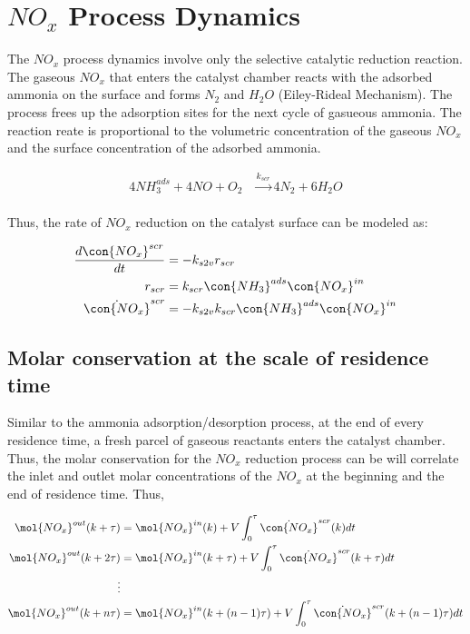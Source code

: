 \newpage
\section{$NO_x$ Process Dynamics}

The $NO_x$ process dynamics involve only the selective catalytic reduction
reaction. The gaseous $NO_x$ that enters the catalyst chamber reacts with the
adsorbed ammonia on the surface and forms $N_2$ and $H_2O$ (Eiley-Rideal
Mechanism). The process frees up the adsorption sites for the next cycle of
gasueous ammonia. The reaction reate is proportional to the volumetric concentration of the gaseous $NO_x$ and the surface concentration of the adsorbed ammonia.

\begin{align}
    4 NH_3 ^{ads} + 4 NO + O_2 &\xrightarrow[]{k_{scr}} 4 N_2 + 6 H_2O
\end{align}


Thus, the rate of $NO_x$ reduction on the catalyst surface can be modeled as:

\begin{align}
    \frac{d \con{NO_x}^{scr}}{dt} &= - k_{s2v} r_{scr} \\
    r_{scr} &= k_{scr} \con{NH_3}^{ads} \con{NO_x}^{in}\\
    \dot{\con{NO_x}}^{scr} &= -k_{s2v} k_{scr} \con{NH_3}^{ads} \con{NO_x}^{in}
\end{align}


\subsection{Molar conservation at the scale of residence time}

Similar to the ammonia adsorption/desorption process, at the end of every
residence time, a fresh parcel of gaseous reactants enters the catalyst
chamber. Thus, the molar conservation for the $NO_x$ reduction process can be
will correlate the inlet and outlet molar concentrations of the $NO_x$ at the
beginning and the end of residence time. Thus,

\begin{align*}
    \mol{NO_x}^{out} (k + \tau) &= \mol{NO_x}^{in} (k) + V \int_{0}^{\tau}  \dot{\con{NO_x}}^{scr} (k) dt\\
    \mol{NO_x}^{out} (k + 2\tau) &= \mol{NO_x}^{in} (k + \tau) + V \int_{0}^{\tau} \dot{\con{NO_x}}^{scr} (k+\tau)  dt\\
    \vdots &\\
    \mol{NO_x}^{out} (k + n\tau) &= \mol{NO_x}^{in} (k + (n-1)\tau) + V \int_{0}^{\tau} \dot{\con{NO_x}}^{scr} (k+(n-1)\tau) dt
\end{align*}

